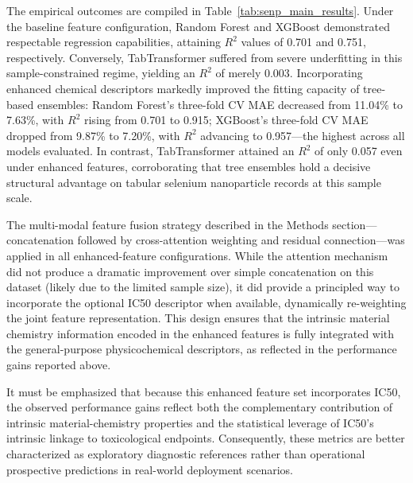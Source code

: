 The empirical outcomes are compiled in Table~\ref{tab:senp_main_results}. Under the baseline feature configuration, Random Forest and XGBoost demonstrated respectable regression capabilities, attaining $R^2$ values of 0.701 and 0.751, respectively. Conversely, TabTransformer suffered from severe underfitting in this sample-constrained regime, yielding an $R^2$ of merely 0.003. Incorporating enhanced chemical descriptors markedly improved the fitting capacity of tree-based ensembles: Random Forest's three-fold CV MAE decreased from 11.04\% to 7.63\%, with $R^2$ rising from 0.701 to 0.915; XGBoost's three-fold CV MAE dropped from 9.87\% to 7.20\%, with $R^2$ advancing to 0.957—the highest across all models evaluated. In contrast, TabTransformer attained an $R^2$ of only 0.057 even under enhanced features, corroborating that tree ensembles hold a decisive structural advantage on tabular selenium nanoparticle records at this sample scale.

The multi-modal feature fusion strategy described in the Methods section—concatenation followed by cross-attention weighting and residual connection—was applied in all enhanced-feature configurations. While the attention mechanism did not produce a dramatic improvement over simple concatenation on this dataset (likely due to the limited sample size), it did provide a principled way to incorporate the optional IC50 descriptor when available, dynamically re-weighting the joint feature representation. This design ensures that the intrinsic material chemistry information encoded in the enhanced features is fully integrated with the general-purpose physicochemical descriptors, as reflected in the performance gains reported above.

It must be emphasized that because this enhanced feature set incorporates IC50, the observed performance gains reflect both the complementary contribution of intrinsic material-chemistry properties and the statistical leverage of IC50's intrinsic linkage to toxicological endpoints. Consequently, these metrics are better characterized as exploratory diagnostic references rather than operational prospective predictions in real-world deployment scenarios.

